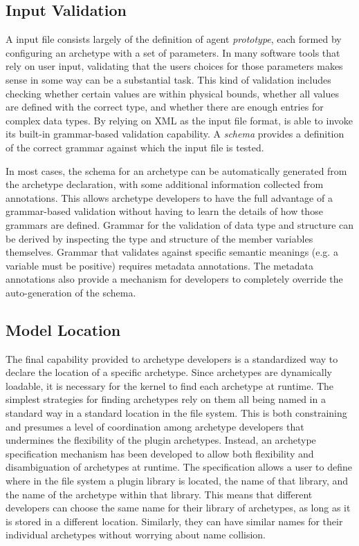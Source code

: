 \subsection{Input Validation}

A \Cyclus input file consists largely of the definition of agent
\textit{prototype}, each formed by configuring an archetype with a set of
parameters.  In many software tools that rely on user input, validating that
the users choices for those parameters makes sense in some way can be a
substantial task.  This kind of validation includes checking whether certain
values are within physical bounds, whether all values are defined with the
correct type, and whether there are enough entries for complex data types.  By
relying on \gls{XML} as the input file format, \Cyclus is able to invoke its
built-in grammar-based validation capability.  A \emph{schema} provides a
definition of the correct grammar against which the input file is tested.

In most cases, the schema for an archetype can be automatically generated from
the archetype declaration, with some additional information collected from
annotations.  This allows archetype developers to have the full advantage of a
grammar-based validation without having to learn the details of how those
grammars are defined.  Grammar for the validation of data type and structure
can be derived by inspecting the type and structure of the member variables
themselves.  Grammar that validates against specific semantic meanings (e.g. a
variable must be positive) requires metadata annotations.  The metadata
annotations also provide a mechanism for developers to completely override the
auto-generation of the schema.

\subsection{Model Location}\label{sec:model_location}

The final capability provided to archetype developers is a standardized way to
declare the location of a specific archetype.  Since archetypes are
dynamically loadable, it is necessary for the \Cyclus kernel to find each
archetype at runtime.  The simplest strategies for finding archetypes rely on
them all being named in a standard way in a standard location in the
file system.  This is both constraining and presumes a level of coordination
among archetype developers that undermines the flexibility of the plugin
archetypes.  Instead, an archetype specification mechanism has been developed
to allow both flexibility and disambiguation of archetypes at runtime.  The
specification allows a user to define where in the file system a plugin library
is located, the name of that library, and the name of the archetype within
that library.  This means that different developers can choose the same name
for their library of archetypes, as long as it is stored in a different
location.  Similarly, they can have similar names for their individual
archetypes without worrying about name collision.


